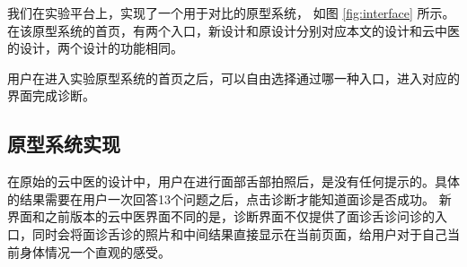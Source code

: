 我们在实验平台上，实现了一个用于对比的原型系统， 如图  \ref{fig:interface} 所示。在该原型系统的首页，有两个入口，新设计和原设计分别对应本文的设计和云中医的设计，两个设计的功能相同。

用户在进入实验原型系统的首页之后，可以自由选择通过哪一种入口，进入对应的界面完成诊断。

\subsection{原型系统实现}



在原始的云中医的设计中，用户在进行面部舌部拍照后，是没有任何提示的。具体的结果需要在用户一次回答13个问题之后，点击诊断才能知道面诊是否成功。
新界面和之前版本的云中医界面不同的是，诊断界面不仅提供了面诊舌诊问诊的入口，同时会将面诊舌诊的照片和中间结果直接显示在当前页面，给用户对于自己当前身体情况一个直观的感受。

